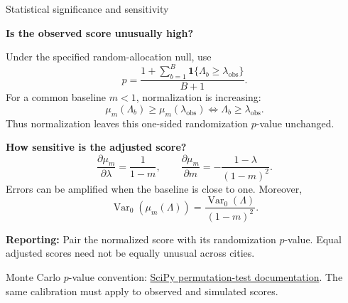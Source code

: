 \documentclass[aspectratio=169,10pt]{beamer}
\begin{document}
\begin{frame}[shrink=0]{Statistical significance and sensitivity}
\small

\textbf{Is the observed score unusually high?}

Under the specified random-allocation null, use
\[
    p=\frac{
        1+\sum_{b=1}^{B}
        \mathbf{1}\{\Lambda_b\geq\lambda_{\mathrm{obs}}\}
    }{B+1}.
\]
For a common baseline $m<1$, normalization is increasing:
\[
    \mu_m(\Lambda_b)\geq\mu_m(\lambda_{\mathrm{obs}})
    \iff
    \Lambda_b\geq\lambda_{\mathrm{obs}}.
\]
Thus normalization leaves this one-sided randomization
$p$-value unchanged.

\medskip
\textbf{How sensitive is the adjusted score?}
\[
    \frac{\partial\mu_m}{\partial\lambda}
      =\frac1{1-m},
    \qquad
    \frac{\partial\mu_m}{\partial m}
      =-\frac{1-\lambda}{(1-m)^2}.
\]
Errors can be amplified when the baseline is close to one.
Moreover,
\[
    \operatorname{Var}_0(\mu_m(\Lambda))
      =\frac{\operatorname{Var}_0(\Lambda)}{(1-m)^2}.
\]

\textbf{Reporting:}
Pair the normalized score with its randomization $p$-value.
Equal adjusted scores need not be equally unusual across cities.

\medskip
{\scriptsize
Monte Carlo $p$-value convention:
\href{https://docs.scipy.org/doc/scipy/reference/generated/scipy.stats.permutation_test.html}
{SciPy permutation-test documentation}.
The same calibration must apply to observed and simulated scores.
}

\end{frame}
\end{document}

